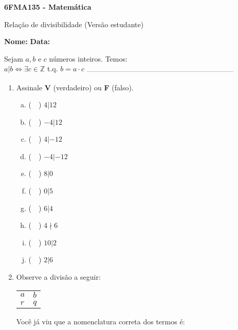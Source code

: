 \documentclass[a4paper,14pt]{article}
\begin{document}
	
	\noindent\textbf{6FMA135 - Matemática} 
	
	\begin{center}Relação de divisibilidade (Versão estudante)
	\end{center}
	
	\noindent\textbf{Nome:} \underline{\hspace{10cm}}
	\noindent\textbf{Data:} \underline{\hspace{4cm}}
	
	
	\begin{multicols}{2}
	    \noindent Sejam $a, b$ e $c$ números inteiros. Temos: \\
	    $a | b \Leftrightarrow \exists$$c \in \mathbb{Z}$ t.q. $b = a \cdot c$
		\noindent\textsubscript{--------------------------------------------------------------------------}
		\begin{enumerate} 
			\item Assinale \textbf{V} (verdadeiro) ou \textbf{F} (falso).
			\begin{enumerate}[a)]
				\item (~~) $4 | 12$
				\item (~~) $-4 | 12$
				\item (~~) $4 | -12$
				\item (~~) $-4 | -12$
				\item (~~) $8 | 0$
				\item (~~) $0 | 5$
				\item (~~) $6 | 4$
				\item (~~) $4 \nmid 6$
				\item (~~) $10 | 2$
				\item (~~) $2 | 6$
			\end{enumerate}
			\item Observe a divisão a seguir: \\
			\begin{table}[H]
				\centering
				\begin{tabular}{ll}
					\multicolumn{1}{l|}{$a$} & $b$ \\ \cline{2-2} 
					$r$                      & $q$
				\end{tabular}
			\end{table}
			Você já viu que a nomenclatura correta dos termos é: \\

\end{enumerate}$$
\end{multicols}
\end{document}

